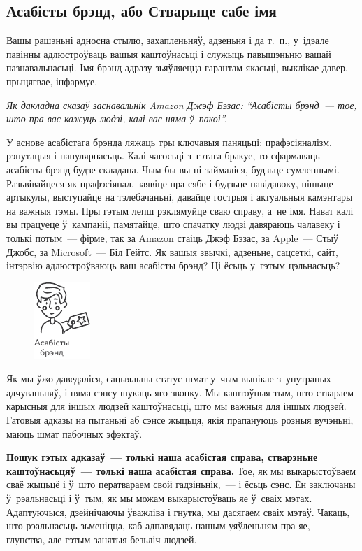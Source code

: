 \subsection*{Асабісты брэнд, або Стварыце сабе імя}

Вашы рашэньні адносна стылю, захапленьняў, адзеньня і да т.~п., у~ідэале павінны адлюстроўваць вашыя каштоўнасьці і служыць павышэньню вашай пазнавальнасьці. Імя-брэнд адразу зьяўляецца гарантам якасьці, выклікае давер, прыцягвае, інфармуе.

\emph{Як дакладна сказаў заснавальнік Amazon Джэф Бэзас: ``Асабісты брэнд~--- тое, што пра вас кажуць людзі, калі вас няма ў~пакоі''.}

У аснове асабістага брэнда ляжаць тры ключавыя паняцьці: прафэсіяналізм, рэпутацыя і папулярнасьць. Калі чагосьці з~гэтага бракуе, то сфармаваць асабісты брэнд будзе складана. Чым бы вы ні займаліся, будзьце сумленнымі. Разьвівайцеся як прафэсіянал, заявіце пра сябе і будзьце навідавоку, пішыце артыкулы, выступайце на тэлебачаньні, давайце гострыя і актуальныя камэнтары на важныя тэмы. Пры гэтым лепш рэклямуйце сваю справу, а~не імя. Нават калі вы працуеце ў~кампаніі, памятайце, што спачатку людзі давяраюць чалавеку і толькі потым~--- фірме, так за Amazon стаіць Джэф Бэзас, за Apple~--- Стыў Джобс, за Microsoft~--- Біл Гейтс. Як вашыя звычкі, адзеньне, сацсеткі, сайт, інтэрвію адлюстроўваюць ваш асабісты брэнд? Ці ёсьць у~гэтым цэльнасьць?

\begin{figure}[htb!]
  \centering
  \includegraphics[scale=1.5]{willpower/ch9/13.pdf}
\end{figure}

Як мы ўжо даведаліся, сацыяльны статус шмат у~чым вынікае з~унутраных адчуваньняў, і няма сэнсу шукаць яго звонку. Мы каштоўныя тым, што ствараем карысныя для іншых людзей каштоўнасьці, што мы важныя для іншых людзей. Гатовыя адказы на пытаньні аб сэнсе жыцьця, якія прапануюць розныя вучэньні, маюць шмат пабочных эфэктаў.

\textbf{Пошук гэтых адказаў~--- толькі наша асабістая справа, стварэньне каштоўнасьцяў~--- толькі наша асабістая справа.} Тое, як мы выкарыстоўваем сваё жыцьцё і ў~што ператвараем свой гадзіньнік,~--- і ёсьць сэнс. Ён заключаны ў~рэальнасьці і ў~тым, як мы можам выкарыстоўваць яе ў~сваіх мэтах. Адаптуючыся, дзейнічаючы ўважліва і гнутка, мы дасягаем сваіх мэтаў. Чакаць, што рэальнасьць зьменіцца, каб адпавядаць нашым уяўленьням пра яе, -- глупства, але гэтым занятыя безьліч людзей. 

